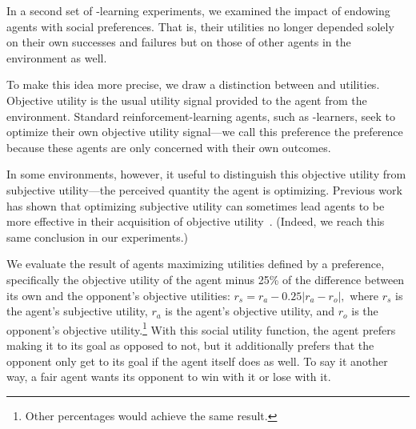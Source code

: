 
In a second set of \Q-learning experiments, we examined the impact of
endowing agents with social preferences. That is, their utilities no
longer depended solely on their own successes and failures but on
those of other agents in the environment as well.

To make this idea more precise, we draw a distinction between
 and  utilities.  Objective
utility is the usual utility signal provided to the agent from the
environment.  Standard reinforcement-learning agents, such
as \Q-learners, seek to optimize their own objective utility
signal---we call this preference the  preference
because these agents are only concerned with their own outcomes.

In some environments, however, it useful to distinguish this objective
utility from subjective utility---the perceived quantity the agent is
optimizing. Previous work has shown that optimizing subjective utility
can sometimes lead agents to be more effective in their acquisition of
objective utility~\cite{singh2009rewards}.  (Indeed, we reach this same
conclusion in our experiments.)


We evaluate the result of agents maximizing utilities defined
by a  preference, specifically the objective utility
of the agent minus 25\% of the difference between its own and the
opponent's objective utilities: $r_{s} = r_{a} - 0.25 \left| r_{a} -
r_{o} \right|,$ where $r_{s}$ is the agent's subjective utility,
$r_{a}$ is the agent's objective utility, and $r_{o}$ is the opponent's
objective utility.\footnote{Other percentages would achieve the same
result.}  
With this social utility function, the agent prefers making it to its
goal as opposed to not, but it additionally prefers that the opponent
only get to its goal if the agent itself does as well. To say it
another way, a fair agent wants its opponent to win with it or lose
with it.


